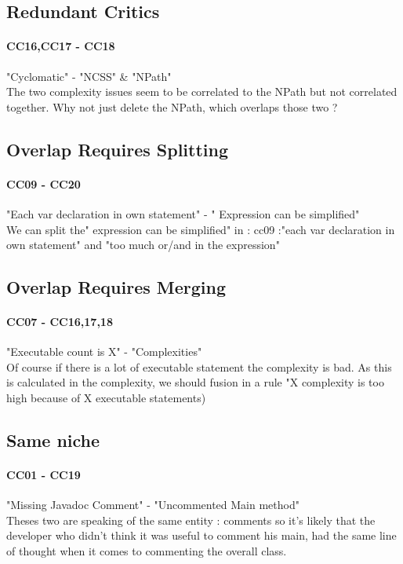 \documentclass{article}
\begin{document}
\subsection{Redundant Critics}
\paragraph{CC16,CC17 - CC18 }
 "Cyclomatic" - "NCSS" \& "NPath" \\
The two complexity issues seem to be correlated to the NPath but not correlated together. Why not just delete the NPath, which overlaps those two ?

\subsection{Overlap Requires Splitting}
\paragraph{CC09  - CC20}
"Each var declaration in own statement" - " Expression can be simplified" \\
We can split the" expression can be simplified" in : cc09 :"each var declaration in own statement" and "too much or/and in the expression" 

\subsection{Overlap Requires Merging}
\paragraph{CC07 - CC16,17,18}
"Executable count is X" -  "Complexities"\\
Of course if there is a lot of executable statement the complexity is bad. As this is calculated in the complexity, we should fusion in a rule "X complexity is too high because of X executable statements) 





\subsection{Same niche}
\paragraph{CC01 - CC19} 
 "Missing Javadoc Comment" - "Uncommented Main method" \\
Theses two are speaking of the same entity : comments so it's likely that the developer who didn't think it was useful to comment his main, had the same line of thought when it comes to commenting the overall class.
\end{document}
